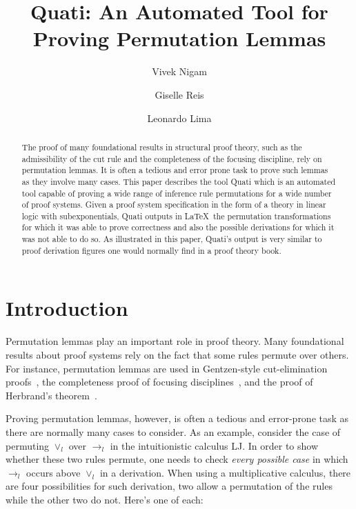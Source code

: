\documentclass{llncs}
\title{Quati: An Automated Tool for Proving Permutation Lemmas}
\author{Vivek Nigam\inst{1} \and Giselle Reis\inst{2} \and Leonardo Lima\inst{1}}
\institute{Universidade Federal da Para\'{i}ba, Brazil
\and Technische Universit\"{a}t Wien, Austria
}
\begin{document}
\maketitle

\begin{abstract}
The proof of many foundational results in structural proof theory, such as the
admissibility of the cut rule and the completeness of the focusing discipline,
rely on permutation lemmas. It is often a tedious and error prone task to prove
such lemmas as they involve many cases. This paper describes the tool Quati
which is an automated tool capable of proving a wide range of inference rule
permutations for a wide number of proof systems. Given a proof system
specification in the form of a theory in linear logic with subexponentials,
Quati outputs in \LaTeX\ the permutation transformations for which it was able
to prove correctness and also the 
possible derivations for which it was not able to do so. As illustrated in this
paper, Quati's output is very similar to proof derivation figures one would
normally find in a proof theory book. 
\end{abstract}

\vspace{-2mm}
\section{Introduction}

Permutation lemmas play an important role in proof theory. Many foundational
results about proof systems rely on the fact that some rules
permute over others. For instance, permutation lemmas are used in Gentzen-style 
cut-elimination proofs~\cite{gentzen35}, 
the completeness proof of focusing disciplines~\cite{andreoli92jlc,miller07cslb}, 
and the proof of Herbrand's theorem~\cite{herbrand30phd}.

Proving permutation lemmas, however, is often a tedious and error-prone task as there are normally many 
cases to consider. As an example, consider the case of permuting $\vee_l$ over $\rightarrow_l$ in
the intuitionistic calculus LJ. In order to show whether these two
rules permute, one needs to check \emph{every possible case} in which
$\rightarrow_l$ occurs above $\vee_l$ in a derivation. When using a
multiplicative calculus, there are four possibilities for such derivation, two
allow a permutation of the rules while the other two do not.
Here's one of each:
\vspace{-4mm}
\end{document}
